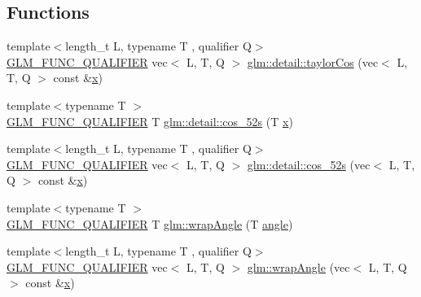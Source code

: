 \subsection*{Functions}
\begin{DoxyCompactItemize}
\item 
{\footnotesize template$<$length\+\_\+t L, typename T , qualifier Q$>$ }\\\mbox{\hyperlink{setup_8hpp_a33fdea6f91c5f834105f7415e2a64407}{G\+L\+M\+\_\+\+F\+U\+N\+C\+\_\+\+Q\+U\+A\+L\+I\+F\+I\+ER}} vec$<$ L, T, Q $>$ \mbox{\hyperlink{namespaceglm_1_1detail_a2cb8ceabe04661b078d956cf0a5e96c7}{glm\+::detail\+::taylor\+Cos}} (vec$<$ L, T, Q $>$ const \&\mbox{\hyperlink{_s_d_l__opengl_8h_ad0e63d0edcdbd3d79554076bf309fd47}{x}})
\item 
{\footnotesize template$<$typename T $>$ }\\\mbox{\hyperlink{setup_8hpp_a33fdea6f91c5f834105f7415e2a64407}{G\+L\+M\+\_\+\+F\+U\+N\+C\+\_\+\+Q\+U\+A\+L\+I\+F\+I\+ER}} T \mbox{\hyperlink{namespaceglm_1_1detail_a09055f8d723109dc95c8cc2309e20acc}{glm\+::detail\+::cos\+\_\+52s}} (T \mbox{\hyperlink{_s_d_l__opengl_8h_ad0e63d0edcdbd3d79554076bf309fd47}{x}})
\item 
{\footnotesize template$<$length\+\_\+t L, typename T , qualifier Q$>$ }\\\mbox{\hyperlink{setup_8hpp_a33fdea6f91c5f834105f7415e2a64407}{G\+L\+M\+\_\+\+F\+U\+N\+C\+\_\+\+Q\+U\+A\+L\+I\+F\+I\+ER}} vec$<$ L, T, Q $>$ \mbox{\hyperlink{namespaceglm_1_1detail_af69b36906b6e079461bf24ba03c89e73}{glm\+::detail\+::cos\+\_\+52s}} (vec$<$ L, T, Q $>$ const \&\mbox{\hyperlink{_s_d_l__opengl_8h_ad0e63d0edcdbd3d79554076bf309fd47}{x}})
\item 
{\footnotesize template$<$typename T $>$ }\\\mbox{\hyperlink{setup_8hpp_a33fdea6f91c5f834105f7415e2a64407}{G\+L\+M\+\_\+\+F\+U\+N\+C\+\_\+\+Q\+U\+A\+L\+I\+F\+I\+ER}} T \mbox{\hyperlink{group__gtx__fast__trigonometry_ga069527c6dbd64f53435b8ebc4878b473}{glm\+::wrap\+Angle}} (T \mbox{\hyperlink{_s_d_l__opengl__glext_8h_a9e06c1f76a20fed54ca742cd25cb02c4}{angle}})
\item 
{\footnotesize template$<$length\+\_\+t L, typename T , qualifier Q$>$ }\\\mbox{\hyperlink{setup_8hpp_a33fdea6f91c5f834105f7415e2a64407}{G\+L\+M\+\_\+\+F\+U\+N\+C\+\_\+\+Q\+U\+A\+L\+I\+F\+I\+ER}} vec$<$ L, T, Q $>$ \mbox{\hyperlink{namespaceglm_a7500f6763ca1feb7c2ab574bede4999d}{glm\+::wrap\+Angle}} (vec$<$ L, T, Q $>$ const \&\mbox{\hyperlink{_s_d_l__opengl_8h_ad0e63d0edcdbd3d79554076bf309fd47}{x}})

\end{DoxyCompactItemize}
